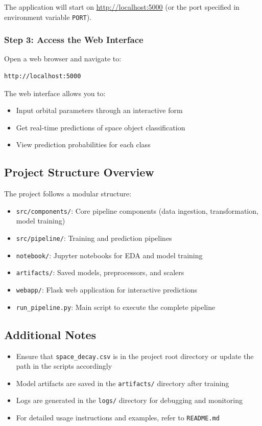 \documentclass[12pt,a4paper]{article}
\begin{document}
The application will start on \url{http://localhost:5000} (or the port specified in environment variable \texttt{PORT}).

\subsubsection{Step 3: Access the Web Interface}
Open a web browser and navigate to:
\begin{verbatim}
http://localhost:5000
\end{verbatim}

The web interface allows you to:
\begin{itemize}
    \item Input orbital parameters through an interactive form
    \item Get real-time predictions of space object classification
    \item View prediction probabilities for each class
\end{itemize}

\subsection{Project Structure Overview}
The project follows a modular structure:
\begin{itemize}
    \item \texttt{src/components/}: Core pipeline components (data ingestion, transformation, model training)
    \item \texttt{src/pipeline/}: Training and prediction pipelines
    \item \texttt{notebook/}: Jupyter notebooks for EDA and model training
    \item \texttt{artifacts/}: Saved models, preprocessors, and scalers
    \item \texttt{webapp/}: Flask web application for interactive predictions
    \item \texttt{run\_pipeline.py}: Main script to execute the complete pipeline
\end{itemize}

\subsection{Additional Notes}
\begin{itemize}
    \item Ensure that \texttt{space\_decay.csv} is in the project root directory or update the path in the scripts accordingly
    \item Model artifacts are saved in the \texttt{artifacts/} directory after training
    \item Logs are generated in the \texttt{logs/} directory for debugging and monitoring
    \item For detailed usage instructions and examples, refer to \texttt{README.md}
\end{itemize}
\end{document}
